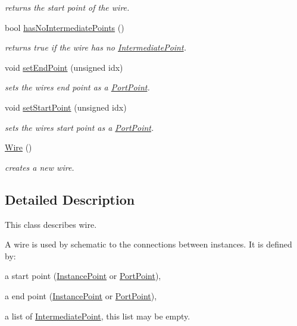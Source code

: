 \begin{DoxyCompactItemize}
\begin{DoxyCompactList}\small\item\em returns the start point of the wire. \end{DoxyCompactList}\item 
\mbox{\label{class_open_chams_1_1_wire_abe5aa44c424e8b7bee9645af10ee0a23}} 
bool \hyperlink{class_open_chams_1_1_wire_abe5aa44c424e8b7bee9645af10ee0a23}{has\+No\+Intermediate\+Points} ()
\begin{DoxyCompactList}\small\item\em returns true if the wire has no \hyperlink{class_open_chams_1_1_intermediate_point}{Intermediate\+Point}. \end{DoxyCompactList}\item 
void \hyperlink{class_open_chams_1_1_wire_a25430c9acf02567164074625ba56e5ef}{set\+End\+Point} (unsigned idx)
\begin{DoxyCompactList}\small\item\em sets the wire\textquotesingle{}s end point as a \hyperlink{class_open_chams_1_1_port_point}{Port\+Point}. \end{DoxyCompactList}\item 
void \hyperlink{class_open_chams_1_1_wire_a37335a2ff923eb45ff5d4f2f4e41b8b1}{set\+Start\+Point} (unsigned idx)
\begin{DoxyCompactList}\small\item\em sets the wire\textquotesingle{}s start point as a \hyperlink{class_open_chams_1_1_port_point}{Port\+Point}. \end{DoxyCompactList}\item 
\mbox{\label{class_open_chams_1_1_wire_a66b8cdcb08d46fe66f1b910ff05ea328}} 
\hyperlink{class_open_chams_1_1_wire_a66b8cdcb08d46fe66f1b910ff05ea328}{Wire} ()
\begin{DoxyCompactList}\small\item\em creates a new wire. \end{DoxyCompactList}\end{DoxyCompactItemize}


\subsection{Detailed Description}
This class describes wire.

A wire is used by schematic to the connections between instances. It is defined by\+:
\begin{DoxyItemize}
\item a start point (\hyperlink{class_open_chams_1_1_instance_point}{Instance\+Point} or \hyperlink{class_open_chams_1_1_port_point}{Port\+Point}),
\item a end point (\hyperlink{class_open_chams_1_1_instance_point}{Instance\+Point} or \hyperlink{class_open_chams_1_1_port_point}{Port\+Point}),
\item a list of \hyperlink{class_open_chams_1_1_intermediate_point}{Intermediate\+Point}, this list may be empty.
\end{DoxyItemize}

